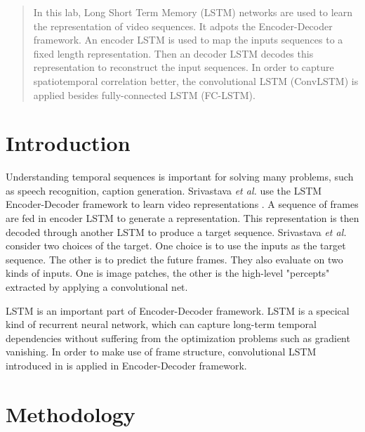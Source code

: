 \documentclass[twoside,a4paper,article]{combine}
\begin{document}


\begin{abstract}
In this lab, Long Short Term Memory (LSTM) networks are used to learn the representation of video sequences. It adpots the Encoder-Decoder
framework. An encoder LSTM is used to map the inputs sequences to a fixed length representation. Then an decoder LSTM decodes this
representation to reconstruct the input sequences. In order to capture spatiotemporal correlation better, the convolutional LSTM
(ConvLSTM) is applied besides fully-connected LSTM (FC-LSTM).

\end{abstract}

\tableofcontents
\newpage


\section{Introduction}
Understanding temporal sequences is important for solving many problems, such as speech recognition, caption generation. Srivastava
\emph{et al.} use the LSTM Encoder-Decoder framework to learn video representations \cite{ulvr}. A sequence of frames are fed in encoder 
LSTM to generate a representation. This representation is then decoded through another LSTM to produce a target sequence. Srivastava
\emph{et al.} consider two choices of the target. One choice is to use the inputs as the target sequence. The other is to predict the
future frames. They also evaluate on two kinds of inputs. One is image patches, the other is the high-level "percepts" extracted by
applying a convolutional net.

LSTM is an important part of Encoder-Decoder framework. LSTM is a specical kind of recurrent neural network, which can capture long-term
temporal dependencies without suffering from the optimization problems such as gradient vanishing. In order to make use of frame structure,
convolutional LSTM introduced in \cite{convlstm} is applied in Encoder-Decoder framework.

\section{Methodology}
\end{document}
